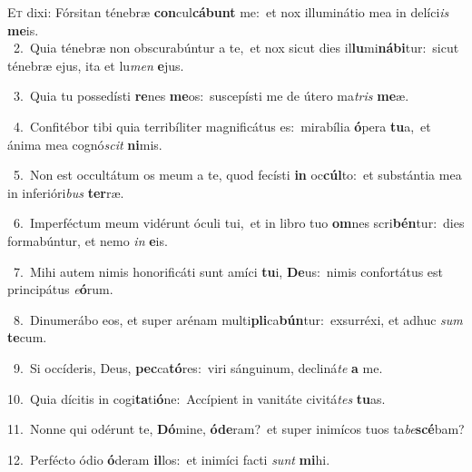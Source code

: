 \lettrine{\initial\textcolor{\initialcolor}{E}}{t} dixi: Fórsitan ténebræ \textbf{con}\-cul\-\textbf{cá}\-\textbf{bunt} me:~\star et nox illuminátio mea in delíci\textit{is} \textbf{me}\-is.\\
{\numbfont\textcolor{\numbcolor}{~2.}}~Quia ténebræ non obscurabúntur a te,~\dagger et nox sicut dies il\-\textbf{lu}\-mi\-\textbf{ná}\-\textbf{bi}tur:~\star sicut ténebræ ejus, ita et lu\textit{men} \textbf{e}\-jus.\par
{\numbfont\textcolor{\numbcolor}{~3.}}~Quia tu possedísti \textbf{re}\-nes \textbf{me}\-os:~\star suscepísti me de útero ma\textit{tris} \textbf{me}\-æ.\par
{\numbfont\textcolor{\numbcolor}{~4.}}~Confitébor tibi quia terribíliter magnificátus es:~\dagger mirabília \textbf{ó}\-pera \textbf{tu}\-a,~\star et ánima mea cognó\textit{scit} \textbf{ni}\-mis.\par
{\numbfont\textcolor{\numbcolor}{~5.}}~Non est occultátum os meum a te, quod fecísti \textbf{in} oc\-\textbf{cúl}\-to:~\star et substántia mea in inferióri\textit{bus} \textbf{ter}\-ræ.\par
{\numbfont\textcolor{\numbcolor}{~6.}}~Imperféctum meum vidérunt óculi tui,~\dagger et in libro tuo \textbf{om}\-nes scri\-\textbf{bén}\-tur:~\star dies formabúntur, et nemo \textit{in} \textbf{e}\-is.\par
{\numbfont\textcolor{\numbcolor}{~7.}}~Mihi autem nimis honorificáti sunt amíci \textbf{tu}\-i, \textbf{De}\-us:~\star nimis confortátus est principátus \textit{e}\-\textbf{ó}rum.\par
{\numbfont\textcolor{\numbcolor}{~8.}}~Dinumerábo eos, et super arénam multi\-\textbf{pli}\-ca\-\textbf{bún}\-tur:~\star exsurréxi, et adhuc \textit{sum} \textbf{te}\-cum.\par
{\numbfont\textcolor{\numbcolor}{~9.}}~Si occíderis, Deus, \textbf{pec}\-ca\-\textbf{tó}\-res:~\star viri sánguinum, decliná\textit{te} \textbf{a} me.\par
{\numbfont\textcolor{\numbcolor}{10.}}~Quia dícitis in cogi\-\textbf{ta}\-ti\-\textbf{ó}\-ne:~\star Accípient in vanitáte civitá\textit{tes} \textbf{tu}\-as.\par
{\numbfont\textcolor{\numbcolor}{11.}}~Nonne qui odérunt te, \textbf{Dó}\-mine, \textbf{ó}\-\textbf{de}ram?~\star et super inimícos tuos ta\-\textit{be}\-\textbf{scé}bam?\par
{\numbfont\textcolor{\numbcolor}{12.}}~Perfécto ódio \textbf{ó}\-deram \textbf{il}\-los:~\star et inimíci facti \textit{sunt} \textbf{mi}\-hi.\par
